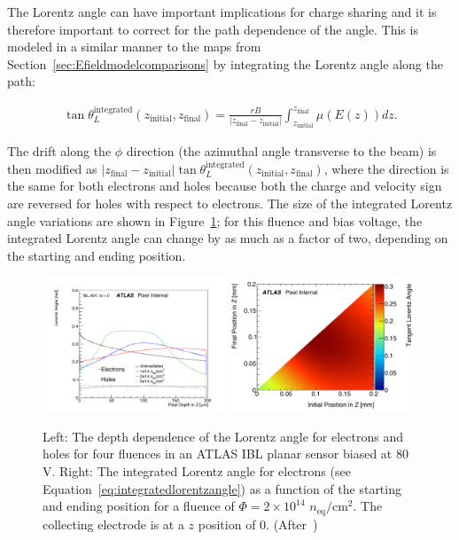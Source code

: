 The Lorentz angle can have important implications for charge sharing and it is therefore important to correct for the path dependence of the angle.  This is modeled in a similar manner to the maps from Section~\ref{sec:Efieldmodelcomparisons} by integrating the Lorentz angle along the path:

\begin{align}
\label{eq:integratedlorentzangle}
\tan\theta_L^\text{integrated}(z_\text{initial},z_\text{final})=\frac{rB}{|z_\text{final}-z_\text{initial}|}\int_{z_\text{initial}}^{z_\text{final}}\mu(E(z)) dz.
\end{align}

The drift along the $\phi$ direction (the azimuthal angle transverse to the beam) is then modified as $|z_\text{final}-z_\text{initial}|\tan\theta_L^\text{integrated}(z_\text{initial},z_\text{final})$, where the direction is the same for both electrons and holes because both the charge and velocity sign are reversed for holes with respect to electrons. The size of the integrated Lorentz angle variations are shown in Figure~\ref{fig:lorentzangle:Run2}; for this fluence and bias voltage, the integrated Lorentz angle can change by as much as a factor of two, depending on the starting and ending position.  

\begin{figure}[htpb!]
\centering
\includegraphics[width=0.49\textwidth]{new2Angle_0fluence80V.pdf}
\includegraphics[width=0.49\textwidth]{newRun2.pdf}
\caption{Left: The depth dependence of the Lorentz angle for electrons and holes for four fluences in an ATLAS IBL planar sensor biased at 80 V.  Right: The integrated Lorentz angle for electrons (see Equation~\ref{eq:integratedlorentzangle}) as a function of the starting and ending position for a fluence of $\Phi=2\times10^{14}$ $n_\text{eq}/\text{cm}^2$.  The collecting electrode is at a $z$ position of $0$. (After~\cite{Benoit:2255825})}
\label{fig:lorentzangle:Run2}
\end{figure}


